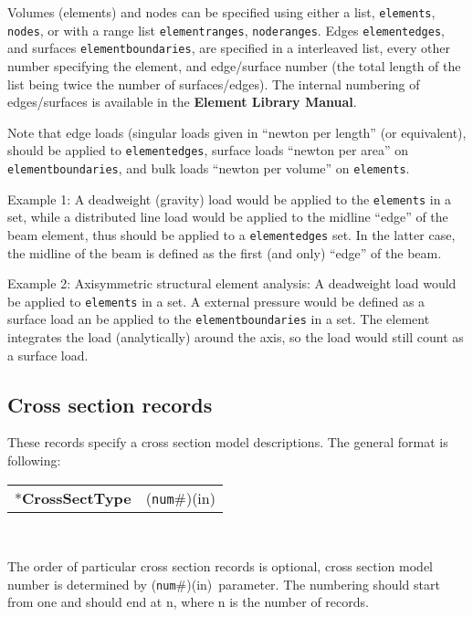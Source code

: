 \documentclass[a4paper]{article}
\makeatletter
\newcommand{\param}[1]{\texttt{#1}} %
\newcommand{\componentNum}{(\param{num}\#){\tiny(in)}} %
\newcommand{\entKeyword}[1]{*\textbf{#1}} %
\newenvironment{record}[1][]{\begin{tabular}{|ll}}{\end{tabular}\\}
\newcommand{\recentry}[2]{{#1}&{#2}\\}
\newcounter{rcc}
\newenvironment{record}[1][\textwidth]{\setcounter{rcc}{0}\begin{tabular*}{#1}{|ll@{\extracolsep{\fill}}r}}{\end{tabular*}\\}
\newcommand{\recentry}[2]{\ifthenelse{\value{rcc}>0}{&$\backslash$ \\}{\setcounter{rcc}{1}}{#1}&{#2}}
\makeatother
\begin{document}
Volumes (elements) and nodes can be specified using either a list, \param{elements}, \param{nodes}, or with a range list \param{elementranges}, \param{noderanges}.
Edges \param{elementedges}, and surfaces \param{elementboundaries}, are specified in a interleaved list, every other number specifying the element, and edge/surface number (the total length of the list being twice the number of surfaces/edges).
The internal numbering of edges/surfaces is available in the \textbf{Element Library Manual}.

Note that edge loads (singular loads given in ``newton per length'' (or equivalent), should be applied to \param{elementedges}, surface loads ``newton per area'' on \param{elementboundaries}, and bulk loads ``newton per volume'' on \param{elements}.

Example 1: A deadweight (gravity) load would be applied to the \param{elements} in a set, while a distributed line load would be applied to the midline ``edge'' of the beam element, thus should be applied to a \param{elementedges} set. In the latter case, the midline of the beam is defined as the first (and only) ``edge'' of the beam.

Example 2: Axisymmetric structural element analysis: A deadweight load would be applied to \param{elements} in a set. A external pressure would be defined as a surface load an be applied to the \param{elementboundaries} in a set. The element integrates the load (analytically) around the axis, so the load would still count as a surface load.


\subsection{Cross section records}
\label{_CrossSectionRecords}
These records specify a cross section model descriptions. The general format is
following:

\begin{record}[0.9\textwidth]
  \recentry{\entKeyword{CrossSectType}}{\componentNum}
\end{record}

The order of particular cross section records is optional, cross section model number is determined by \componentNum\ parameter.
The numbering should start from one and should end at n, where n is the number of records.
\end{document}

